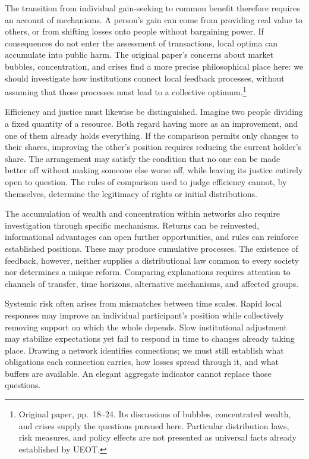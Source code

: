 \documentclass[
  english,
  11pt,
  oneside]{book}
\begin{document}
The transition from individual gain-seeking to common benefit therefore requires an account of mechanisms. A person's gain can come from providing real value to others, or from shifting losses onto people without bargaining power. If consequences do not enter the assessment of transactions, local optima can accumulate into public harm. The original paper's concerns about market bubbles, concentration, and crises find a more precise philosophical place here: we should investigate how institutions connect local feedback processes, without assuming that those processes must lead to a collective optimum.\footnote{\hypertarget{ph-note-61}{}Original paper, pp.~18--24. Its discussions of bubbles, concentrated wealth, and crises supply the questions pursued here. Particular distribution laws, risk measures, and policy effects are not presented as universal facts already established by UEOT.}

Efficiency and justice must likewise be distinguished. Imagine two people dividing a fixed quantity of a resource. Both regard having more as an improvement, and one of them already holds everything. If the comparison permits only changes to their shares, improving the other's position requires reducing the current holder's share. The arrangement may satisfy the condition that no one can be made better off without making someone else worse off, while leaving its justice entirely open to question. The rules of comparison used to judge efficiency cannot, by themselves, determine the legitimacy of rights or initial distributions.

The accumulation of wealth and concentration within networks also require investigation through specific mechanisms. Returns can be reinvested, informational advantages can open further opportunities, and rules can reinforce established positions. These may produce cumulative processes. The existence of feedback, however, neither supplies a distributional law common to every society nor determines a unique reform. Comparing explanations requires attention to channels of transfer, time horizons, alternative mechanisms, and affected groups.

Systemic risk often arises from mismatches between time scales. Rapid local responses may improve an individual participant's position while collectively removing support on which the whole depends. Slow institutional adjustment may stabilize expectations yet fail to respond in time to changes already taking place. Drawing a network identifies connections; we must still establish what obligations each connection carries, how losses spread through it, and what buffers are available. An elegant aggregate indicator cannot replace those questions.
\end{document}
